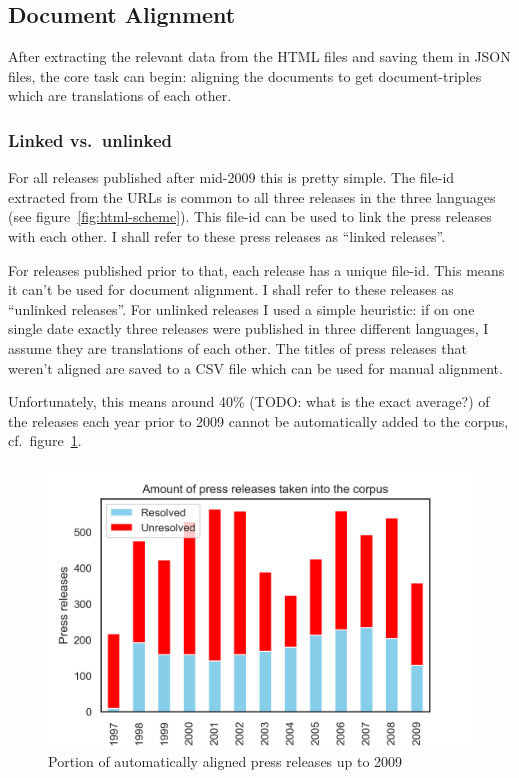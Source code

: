 \subsection{Document Alignment}
After extracting the relevant data from the HTML files and saving them in JSON files, the core task can begin: aligning the documents to get document-triples which are translations of each other.

\subsubsection{Linked vs.~unlinked}
\label{sec:linked-unlinked}
For all releases published after mid-2009 this is pretty simple. 
The file-id extracted from the URLs is common to all three releases in the three languages (see figure~\ref{fig:html-scheme}). 
This file-id can be used to link the press releases with each other. 
I shall refer to these press releases as \enquote{linked releases}.

For releases published prior to that, each release has a unique file-id. 
This means it can't be used for document alignment. 
I shall refer to these releases as \enquote{unlinked releases}.
For unlinked releases I used a simple heuristic: if on one single date exactly three releases were published in three different languages, I assume they are translations of each other. 
The titles of press releases that weren't aligned are saved to a CSV file which can be used for manual alignment.

Unfortunately, this means around 40\% (TODO: what is the exact average?) of the releases each year prior to 2009 cannot be automatically added to the corpus, cf.~figure~\ref{fig:linked-unlinked}.

\begin{figure}[h]
	\centering
	\includegraphics{graphics/linked-unlinked.png}
	\caption{Portion of automatically aligned press releases up to 2009}
	\label{fig:linked-unlinked}
\end{figure}

